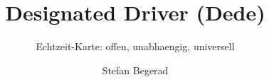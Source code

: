 

\usepackage{hyperref}

\usepackage{colortbl}

\usepackage{listings}

\title[Dede]{Designated Driver (Dede)}
\subtitle{Echtzeit-Karte: offen, unabhaengig, universell}
\author{Stefan Begerad}
